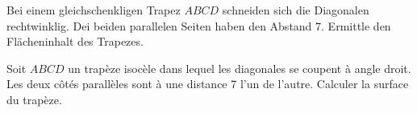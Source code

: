 Bei einem gleichschenkligen Trapez $ABCD$ schneiden sich die Diagonalen rechtwinklig. Dei beiden parallelen Seiten haben den Abstand 7. Ermittle den Flächeninhalt des Trapezes.

\bigskip

Soit $ABCD$ un trapèze isocèle dans lequel les diagonales se coupent à angle droit. Les deux côtés parallèles sont à une distance 7 l'un de l'autre. Calculer la surface du trapèze.